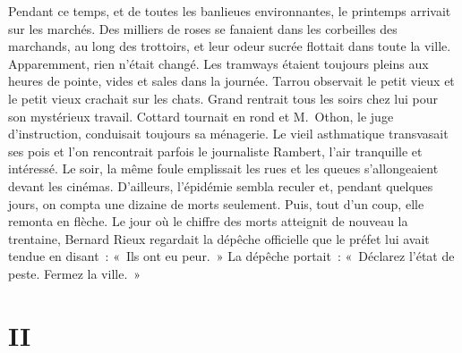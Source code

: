 \documentclass[french,twoside]{book} %
\newcommand\chapteropen{} %
\newcommand\chaptercont{} %
\newcommand\chapterclose{} %
\begin{document}
Pendant ce temps, et de toutes les banlieues environnantes, le printemps arrivait sur les marchés. Des milliers de roses se fanaient dans les corbeilles des marchands, au long des trottoirs, et leur odeur sucrée flottait dans toute la ville. Apparemment, rien n’était changé. Les tramways étaient toujours pleins aux heures de pointe, vides et sales dans la journée. Tarrou observait le petit vieux et le petit vieux crachait sur les chats. Grand rentrait tous les soirs chez lui pour son mystérieux travail. Cottard tournait en rond et M. Othon, le juge d’instruction, conduisait toujours sa ménagerie. Le vieil asthmatique transvasait ses pois et l’on rencontrait parfois le journaliste Rambert, l’air tranquille et intéressé. Le soir, la même foule emplissait les rues et les queues s’allongeaient devant les cinémas. D’ailleurs, l’épidémie sembla reculer et, pendant quelques jours, on compta une dizaine de morts seulement. Puis, tout d’un coup, elle remonta en flèche. Le jour où le chiffre des morts atteignit de nouveau la trentaine, Bernard Rieux regardait la dépêche officielle que le préfet lui avait tendue en disant : « Ils ont eu peur. » La dépêche portait : « Déclarez l’état de peste. Fermez la ville. »
\chapterclose


\chapteropen
\chapter[{II}]{II}\renewcommand{\leftmark}{II}


\chaptercont
\end{document}
